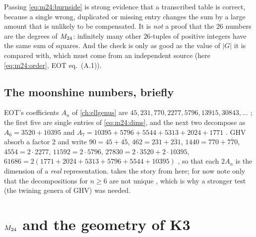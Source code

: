 \begin{pitfallbox}
Passing \eqref{eq:m24:burnside} is strong evidence that a transcribed table is correct,
because a single wrong, duplicated or missing entry changes the sum by a large amount that
is unlikely to be compensated. It is \emph{not} a proof that the $26$ numbers are the
degrees of $M_{24}$: infinitely many other $26$-tuples of positive integers have the same sum
of squares. And the check is only as good as the value of $|G|$ it is compared with, which
must come from an independent source (here \eqref{eq:m24:order}, EOT eq.~(A.1)).
\end{pitfallbox}

\subsection*{The moonshine numbers, briefly}
EOT's coefficients $A_n$ of \cref{ch:ellgenus} are $45, 231, 770, 2277, 5796, 13915, 30843,
\dots$ ; the first five are single entries of
\eqref{eq:m24:dims}, and the next two decompose as $A_6=3520+10395$ and
$A_7=10395+5796+5544+5313+2024+1771$ . GHV
absorb a factor $2$ and write $90=45+\overline{45}$, $462=231+\overline{231}$,
$1440=770+\overline{770}$, $4554=2\cdot2277$, $11592=2\cdot5796$, $27830=2\cdot3520+2\cdot10395$,
$61686=2(1771+2024+5313+5796+5544+10395)$ , so
that each $2A_n$ is the dimension of a \emph{real} representation.  takes
the story from here; for now note only that the decompositions for $n\ge6$ are not unique
, which is why a stronger test (the twining genera of GHV) was
needed.

\section{\texorpdfstring{$M_{24}$}{M24} and the geometry of K3}\label{sec:m24:k3}

